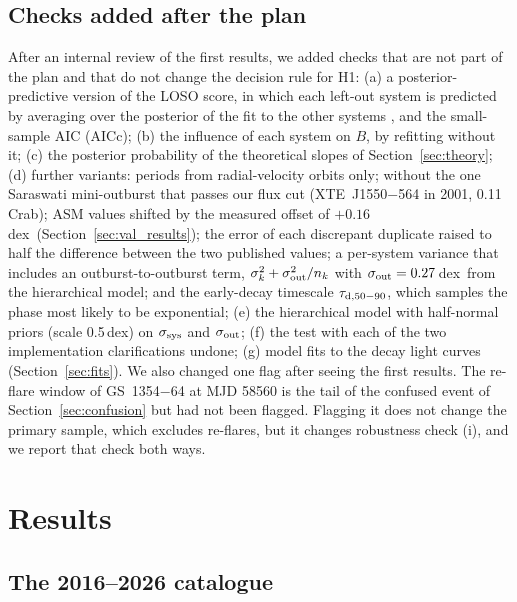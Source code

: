 \documentclass[fleqn,usenatbib]{mnras}
\newcommand{\dex}{\,dex}
\begin{document}
\subsection{Checks added after the plan}
\label{sec:extra}

After an internal review of the first results, we added checks that are not part of the plan and that do not change the decision rule for H1:
(a) a posterior-predictive version of the LOSO score, in which each left-out system is predicted by averaging over the posterior of the fit to the other systems \citep[cf.][]{Vehtari2017}, and the small-sample AIC (AICc);
(b) the influence of each system on $B$, by refitting without it;
(c) the posterior probability of the theoretical slopes of Section~\ref{sec:theory};
(d) further variants: periods from radial-velocity orbits only; without the one Saraswati mini-outburst that passes our flux cut (XTE~J1550$-$564 in 2001, 0.11\,Crab); ASM values shifted by the measured offset of $+0.16$\dex\ (Section~\ref{sec:val_results}); the error of each discrepant duplicate raised to half the difference between the two published values; a per-system variance that includes an outburst-to-outburst term, $\sigma_k^2+\sigma_{\rm out}^2/n_k$ with $\sigma_{\rm out}=0.27$\dex\ from the hierarchical model; and the early-decay timescale $\tau_{\rm d,50-90}$, which samples the phase most likely to be exponential;
(e) the hierarchical model with half-normal priors (scale 0.5\dex) on $\sigma_{\rm sys}$ and $\sigma_{\rm out}$;
(f) the test with each of the two implementation clarifications undone;
(g) model fits to the decay light curves (Section~\ref{sec:fits}).
We also changed one flag after seeing the first results. The re-flare window of GS~1354$-$64 at MJD 58560 is the tail of the confused event of Section~\ref{sec:confusion} but had not been flagged. Flagging it does not change the primary sample, which excludes re-flares, but it changes robustness check (i), and we report that check both ways.

\section{Results}
\label{sec:results}

\subsection{The 2016--2026 catalogue}
\label{sec:catalogue}
\end{document}
